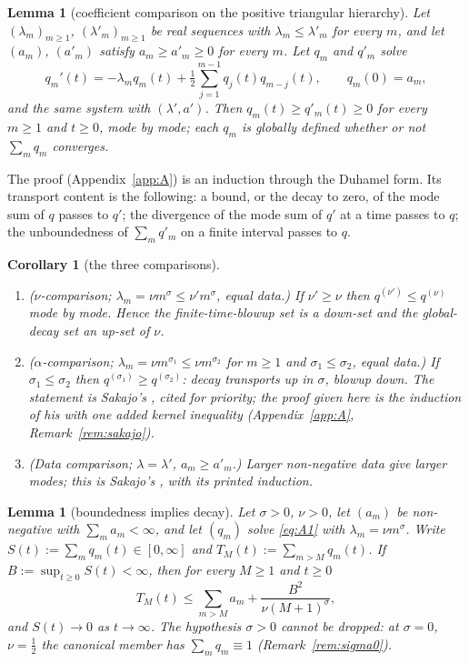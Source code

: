 \documentclass[11pt,a4paper]{article}
\theoremstyle{plain}
\newtheorem{lemma}[theorem]{Lemma}
\newtheorem{corollary}[theorem]{Corollary}
\theoremstyle{definition}
\begin{document}
\begin{lemma}[coefficient comparison on the positive triangular hierarchy]\label{lem:comparison}
Let $(\lambda_m)_{m\ge1}$, $(\lambda'_m)_{m\ge1}$ be real sequences with $\lambda_m\le\lambda'_m$ for every $m$, and let $(a_m)$, $(a'_m)$ satisfy $a_m\ge a'_m\ge0$ for every $m$. Let $q_m$ and $q'_m$ solve
\begin{equation}\label{eq:A1}
q_m'(t)=-\lambda_mq_m(t)+\tfrac12\sum_{j=1}^{m-1}q_j(t)q_{m-j}(t),\qquad q_m(0)=a_m,
\end{equation}
and the same system with $(\lambda',a')$. Then $q_m(t)\ge q'_m(t)\ge0$ for every $m\ge1$ and $t\ge0$, mode by mode; each $q_m$ is globally defined whether or not $\sum_mq_m$ converges.
\end{lemma}
The proof (Appendix~\ref{app:A}) is an induction through the Duhamel form. Its transport content is the following: a bound, or the decay to zero, of the mode sum of $q$ passes to $q'$; the divergence of the mode sum of $q'$ at a time passes to $q$; the unboundedness of $\sum_mq'_m$ on a finite interval passes to $q$.

\begin{corollary}[the three comparisons]\label{cor:comparisons}
\begin{enumerate}[label=(\roman*),leftmargin=2.2em]
\item ($\nu$-comparison; $\lambda_m=\nu m^\sigma\le\nu'm^\sigma$, equal data.) If $\nu'\ge\nu$ then $q^{(\nu')}\le q^{(\nu)}$ mode by mode. Hence the finite-time-blowup set is a down-set and the global-decay set an up-set of $\nu$.
\item ($\alpha$-comparison; $\lambda_m=\nu m^{\sigma_1}\le\nu m^{\sigma_2}$ for $m\ge1$ and $\sigma_1\le\sigma_2$, equal data.) If $\sigma_1\le\sigma_2$ then $q^{(\sigma_1)}\ge q^{(\sigma_2)}$: decay transports up in $\sigma$, blowup down. The statement is Sakajo's \cite[Proposition~1]{Sak03c}, cited for priority; the proof given here is the induction of his \cite[Proposition~2]{Sak03b} with one added kernel inequality (Appendix~\ref{app:A}, Remark~\ref{rem:sakajo}).
\item (Data comparison; $\lambda=\lambda'$, $a_m\ge a'_m$.) Larger non-negative data give larger modes; this is Sakajo's \cite[Proposition~2]{Sak03b}, with its printed induction.
\end{enumerate}
\end{corollary}

\begin{lemma}[boundedness implies decay]\label{lem:bounded}
Let $\sigma>0$, $\nu>0$, let $(a_m)$ be non-negative with $\sum_ma_m<\infty$, and let $(q_m)$ solve \eqref{eq:A1} with $\lambda_m=\nu m^\sigma$. Write $S(t):=\sum_mq_m(t)\in[0,\infty]$ and $T_M(t):=\sum_{m>M}q_m(t)$. If $B:=\sup_{t\ge0}S(t)<\infty$, then for every $M\ge1$ and $t\ge0$
\begin{equation}\label{eq:tail}
T_M(t)\le\sum_{m>M}a_m+\frac{B^2}{\nu(M+1)^\sigma},
\end{equation}
and $S(t)\to0$ as $t\to\infty$. The hypothesis $\sigma>0$ cannot be dropped: at $\sigma=0$, $\nu=\tfrac12$ the canonical member has $\sum_mq_m\equiv1$ (Remark~\ref{rem:sigma0}).
\end{lemma}
\end{document}
